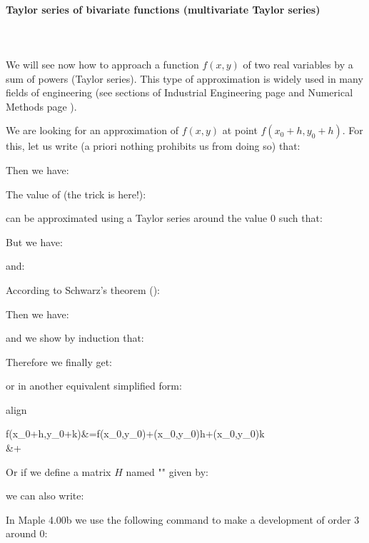 	\pagebreak
	\paragraph{Taylor series of bivariate functions (multivariate Taylor series)}\label{multivariate taylor series}\mbox{}\\\\
	We will see now how to approach a function $f (x, y)$ of two real variables by a sum of powers (Taylor series). This type of approximation is widely used in many fields of engineering (see sections of Industrial Engineering page \pageref{bivariat taylor expansion doe} and Numerical Methods page \pageref{newton raphson method}).
	
	We are looking for an approximation of $f (x, y)$ at point $f(x_0+h,y_0+h)$. For this, let us write (a priori nothing prohibits us from doing so) that:
	
	Then we have:
	
	The value of (the trick is here!):
	
	can be approximated using a Taylor series around the value $0$ such that:
	
	But we have:
	
	and:
	
	According to Schwarz's theorem ():
	
	Then we have:
	
	and we show by induction that:
	
	Therefore we finally get:
	
	or in another equivalent simplified form:
	\begin{empheq}[box=\fbox]{align}
		\begin{split}
  		f(x_0+h,y_0+k)&=f(x_0,y_0)+(x_0,y_0)h+(x_0,y_0)k\\
		&+
		\end{split}
	\end{empheq}
	Or if we define a matrix $H$ named "\label{hessian matrix}" given by:
	
	we can also write:
	
	In Maple 4.00b we use the following command to make a development of order $3$ around $0$:
	
